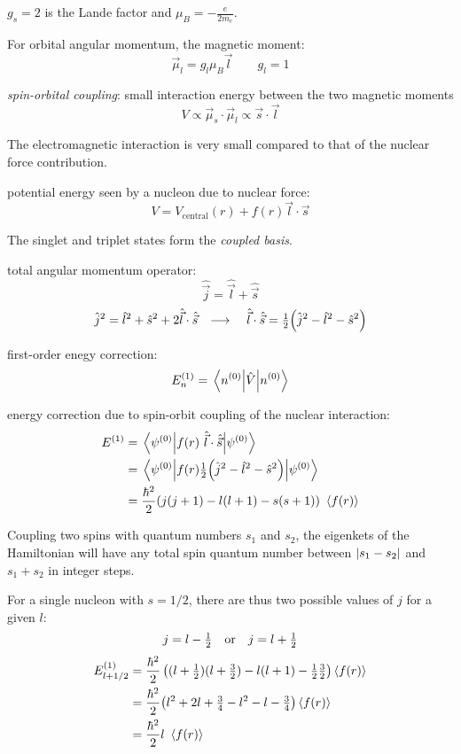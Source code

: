 \documentclass[10pt, a4paper, twocolumn]{article}
\newcommand{\deff}[1]{\par \noindent \textit{#1}: }
\newcommand{\arr}{\ensuremath{\longrightarrow\ }}
\begin{document}
$g_s=2$ is the Lande factor and $\mu _B=-\frac{e}{2m_e}$.

For orbital angular momentum, the magnetic moment:
\[\vec \mu _l = g_l\mu _B\vec l
\qquad g_l=1\]

\deff{spin-orbital coupling}
small interaction energy between the two magnetic moments
\[V\propto \vec \mu _s \cdot \vec \mu _l
\propto \vec s\cdot \vec l\]

The electromagnetic interaction is very small compared to that of the nuclear force contribution.

potential energy seen by a nucleon due to nuclear force:
\[V=V_\text{central}(r) +f(r)\vec l \cdot \vec s\]

The singlet and triplet states form the \emph{coupled basis}.

total angular momentum operator:
\[\hat{\vec{j}} = \hat{\vec{l}} +\hat{\vec{s}}\]
\[\hat j^2 = \hat l^2 +\hat s^2 + 2\hat{\vec{l}}
\cdot \hat{\vec{s}}
\qq{\arr}
\hat{\vec{l}}\cdot \hat{\vec{s}}=\tfrac12
\pqty{\hat j^2-\hat l^2 - \hat s^2} \]

first-order enegy correction:
\[E_n^{(1)}
=\mel{n^{(0)}}{\hat V}{n^{(0)}} \]

energy correction due to spin-orbit coupling of the nuclear interaction:
\begin{equation*}
\begin{aligned}
E^{(1)}
&=\mel{\psi ^{(0)}}
{f(r)\ \hat{\vec{l}} \cdot \hat{\vec{s}}}
{\psi ^{(0)}}
\\&=\mel{\psi ^{(0)}}
{f(r)\tfrac12 \pqty{\hat j^2 - \hat l^2-\hat s^2}}
{\psi ^{(0)}}
\\&=\frac{\hbar ^2}{2}
(j(j+1)-l(l+1) - s(s+1))\ \expval{f(r)}
\end{aligned}
\end{equation*}

Coupling two spins with quantum numbers $s_1$ and $s_2$, the eigenkets of the Hamiltonian will have any total spin quantum number between $\abs{s_1-s_2}$ and $s_1+s_2$ in integer steps.

For a single nucleon with $s=1/2$, there are thus two possible values of $j$ for a given $l$:
\[j=l-\tfrac12 \qq{or} j=l+\tfrac12\]
\begin{equation*}
\begin{aligned}
E_{l+1/2}^{(1)}
&=\frac{\hbar^2}{2}
\left((l+\tfrac12)(l+\tfrac32)
-l(l+1)-\tfrac12 \tfrac32 \right) \expval{f(r)}
\\&= \frac{\hbar^2}{2}
\pqty{l^2+2l+\tfrac34 -l^2-l-\tfrac34}
\expval{f(r)}
\\&=\frac{\hbar ^2}{2}l\ \expval{f(r)}
\end{aligned}
\end{equation*}
\end{document}
